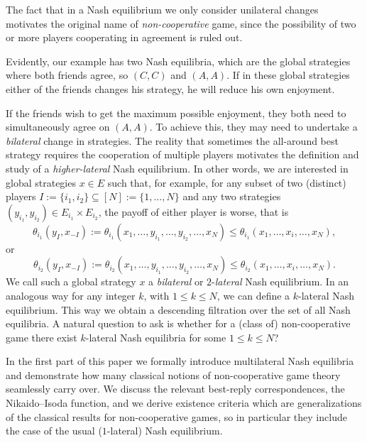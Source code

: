 \documentclass[a4paper,11pt,reqno,english]{amsart}
\theoremstyle{plain}
\theoremstyle{definition}
\begin{document}
\medskip
The fact that in a Nash equilibrium we only consider unilateral changes motivates the original name of \textit{non-cooperative} game, since the possibility of two or more players cooperating in agreement is ruled out.

\medskip
Evidently, our example has two Nash equilibria, which are the global strategies where both friends agree, so $(C,C)$ and $(A,A)$. If in these global strategies either of the friends changes his strategy, he will reduce his own enjoyment.

\medskip
If the friends wish to get the maximum possible enjoyment, they both need to simultaneously agree on $(A,A)$. To achieve this, they may need to undertake a \textit{bilateral} change in strategies. The reality that sometimes the all-around best strategy requires the cooperation of multiple players motivates the definition and study of a \textit{higher-lateral} Nash equilibrium.
In other words, we are interested in global strategies $x\in E$ such that, for example, for any subset of two (distinct) players $I:=\{i_1, i_2\}\subseteq [N] :=\{1,\dots,N\}$ and any two strategies $(y_{i_1}, y_{i_2})\in E_{i_1}\times E_{i_2}$, the payoff of either player is worse, that is
\begin{displaymath}
	\theta_{i_1}(y_I,x_{-I}):=\theta_{i_1}(x_1,\dots,y_{i_1},\dots,y_{i_2},\dots,x_N) \leq \theta_{i_1}(x_1,\dots,x_i,\dots,x_N),
\end{displaymath}
or
\begin{displaymath}
	\theta_{i_2}(y_I,x_{-I}):=\theta_{i_2}(x_1,\dots,y_{i_1},\dots,y_{i_2},\dots,x_N) \leq \theta_{i_2}(x_1,\dots,x_i,\dots,x_N).
\end{displaymath}
We call such a global strategy $x$ a \textit{bilateral} or $2$-\textit{lateral} Nash equilibrium.
In an analogous way for any integer $k$, with $1\leq k\leq N$, we can define a $k$-lateral Nash equilibrium.
This way we obtain a descending filtration over the set of all Nash equilibria.
A natural question to ask is whether for a (class of) non-cooperative game there exist $k$-lateral Nash equilibria for some $1\leq k\leq N$?

\medskip
In the first part of this paper we formally introduce multilateral Nash equilibria and demonstrate how many classical notions of non-cooperative game theory seamlessly carry over. 
We discuss the relevant best-reply correspondences, the Nikaido--Isoda function, and we derive existence criteria which are generalizations of the classical results for non-cooperative games, so in particular they include the case of the usual ($1$-lateral) Nash equilibrium. 
\end{document}
